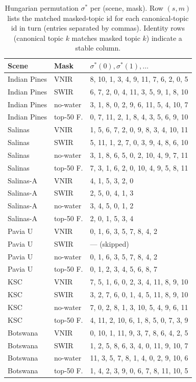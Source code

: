 \documentclass[11pt,a4paper]{article}
\begin{document}
\begin{table}[t]
\caption{Hungarian permutation $\sigma^*$ per (scene, mask). Row
$(s, m)$ lists the matched masked-topic id for each canonical-topic
id in turn (entries separated by commas). Identity rows (canonical
topic $k$ matches masked topic $k$) indicate a stable column.}
\label{tab:hungarian}
\centering
\small
\begin{tabular}{ll p{8cm}}
\toprule
Scene & Mask & $\sigma^*(0), \sigma^*(1), \ldots$ \\
\midrule
Indian Pines & VNIR        & 8, 10, 1, 3, 4, 9, 11, 7, 6, 2, 0, 5 \\
Indian Pines & SWIR        & 6, 7, 2, 0, 4, 11, 3, 5, 9, 1, 8, 10 \\
Indian Pines & no-water    & 3, 1, 8, 0, 2, 9, 6, 11, 5, 4, 10, 7 \\
Indian Pines & top-50 F.   & 0, 7, 11, 2, 1, 8, 4, 3, 5, 6, 9, 10 \\
\addlinespace
Salinas & VNIR        & 1, 5, 6, 7, 2, 0, 9, 8, 3, 4, 10, 11 \\
Salinas & SWIR        & 5, 11, 1, 2, 7, 0, 3, 9, 4, 8, 6, 10 \\
Salinas & no-water    & 3, 1, 8, 6, 5, 0, 2, 10, 4, 9, 7, 11 \\
Salinas & top-50 F.   & 7, 3, 1, 6, 2, 0, 10, 4, 9, 5, 8, 11 \\
\addlinespace
Salinas-A & VNIR        & 4, 1, 5, 3, 2, 0 \\
Salinas-A & SWIR        & 2, 5, 0, 4, 1, 3 \\
Salinas-A & no-water    & 3, 4, 5, 0, 1, 2 \\
Salinas-A & top-50 F.   & 2, 0, 1, 5, 3, 4 \\
\addlinespace
Pavia U & VNIR        & 0, 1, 6, 3, 5, 7, 8, 4, 2 \\
Pavia U & SWIR        & --- (skipped) \\
Pavia U & no-water    & 0, 1, 6, 3, 5, 7, 8, 4, 2 \\
Pavia U & top-50 F.   & 0, 1, 2, 3, 4, 5, 6, 8, 7 \\
\addlinespace
KSC & VNIR        & 7, 5, 1, 6, 0, 2, 3, 4, 11, 8, 9, 10 \\
KSC & SWIR        & 3, 2, 7, 6, 0, 1, 4, 5, 11, 8, 9, 10 \\
KSC & no-water    & 7, 0, 2, 8, 1, 3, 10, 5, 4, 9, 6, 11 \\
KSC & top-50 F.   & 4, 11, 2, 10, 6, 1, 8, 5, 0, 7, 3, 9 \\
\addlinespace
Botswana & VNIR        & 0, 10, 1, 11, 9, 3, 7, 8, 6, 4, 2, 5 \\
Botswana & SWIR        & 1, 2, 5, 8, 6, 3, 4, 0, 11, 9, 10, 7 \\
Botswana & no-water    & 11, 3, 5, 7, 8, 1, 4, 0, 2, 9, 10, 6 \\
Botswana & top-50 F.   & 1, 4, 2, 3, 9, 0, 6, 7, 8, 11, 10, 5 \\
\bottomrule
\end{tabular}
\end{table}
\end{document}
